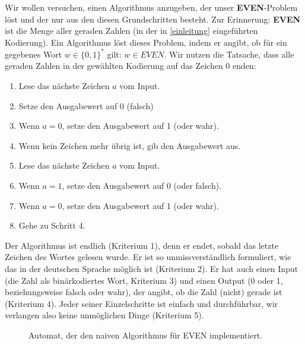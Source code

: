 Wir wollen versuchen, einen Algorithmus anzugeben,
der unser \textbf{EVEN}-Problem löst
und der nur aus den diesen Grundschritten besteht.
Zur Erinnerung: \textbf{EVEN} ist die Menge aller geraden Zahlen
(in der in \autoref{einleitung} eingeführten Kodierung).
Ein Algorithmus löst dieses Problem,
indem er angibt,
ob für ein gegebenes Wort $w \in \{0,1\}^*$ gilt: $w \in EVEN$.
Wir nutzen die Tatsache,
dass alle geraden Zahlen in der gewählten Kodierung auf das Zeichen 0 enden:

\begin{enumerate}
    \item Lese das nächste Zeichen $a$ vom Input.
    \item Setze den Ausgabewert auf 0 (falsch)
    \item Wenn $a = 0$, setze den Ausgabewert auf 1 (oder wahr).
    \item Wenn kein Zeichen mehr übrig ist, gib den Ausgabewert aus.
    \item Lese das nächste Zeichen $a$ vom Input.
    \item Wenn $a = 1$, setze den Ausgabewert auf 0 (oder falsch).
    \item Wenn $a = 0$, setze den Ausgabewert auf 1 (oder wahr).
    \item Gehe zu Schritt 4.
\end{enumerate}

Der Algorithmus ist endlich (Kriterium 1),
denn er endet,
sobald das letzte Zeichen des Wortes gelesen wurde.
Er ist so unmissverständlich formuliert,
wie das in der deutschen Sprache möglich ist (Kriterium 2).
Er hat auch einen Input (die Zahl als binärkodiertes Wort, Kriterium 3)
und einen Output (0 oder 1, beziehungsweise falsch oder wahr),
der angibt, ob die Zahl (nicht) gerade ist (Kriterium 4).
Jeder seiner Einzelschritte ist einfach und durchführbar,
wir verlangen also keine unmöglichen Dinge (Kriterium 5).


\begin{figure}[ht] %
\centering %
\caption{Automat, der den naiven Algorithmus für EVEN implementiert.}
\label{fig:dfaeven}
\end{figure}

